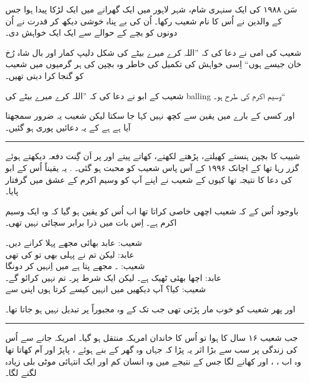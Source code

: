 \documentclass{article}
\begin{document}
\begin{center} \Large
\end{center}

\urdufont		%

سَن ۱۹۸۸ کی ایک سنہری شام، شہر لاہور میں ایک گھرانے میں ایک لڑکا پیدا ہوا جس کے والدین نے اُس کا نام شعیب رکھا۔ اُن کی بے پناہ خوشی دیکھ کر قدرت نے اُن دونوں کو بچے کے حوالے سے ایک ایک خواہش دی۔ 

شعیب کی امی نے دعا کی کہ ''اللہ کرے میرے بیٹے کی شکل دلیپ کمار اور بال شاہ رُخ خان جیسے ہوں`` اِسی خواہش کی تکمیل کی خاطر وہ بچپن کی ہر گرمیوں میں شعیب کو گنجا کرا دیتی تھیں۔ \textit{}

شعیب کے ابو نے دعا کی کہ ''اللہ کرے میرے بیٹے کی balling وسیم اکرم کی طرح ہو۔``

اور کسی کے بارے میں یقین سے کچھ نہیں کہا جا سکتا لیکن شعیب یہ ضرور سمجھتا آیا ہے ہے کے یہ دعائیں پوری ہو گئیں۔

\rule{\textwidth}{1pt}

شییب کا بچپن ہنستے کھیلتے، پڑھتے لکھتے،  کھاتے پیتے اور  پر اَن گِنت دفعہ  دیکھتے ہوئے گزر رہا تھا کے اچانک ۱۹۹۶ کے آس پاس شعیب کو محبت ہو گئی۔ . یہ یقیناً اُس کے ابو کی دعا کا نتیجہ تھا کیوں کے شعیب نے اپنے آپ کو وسیم اکرم کے عشق میں گرفتار پایا۔

باوجود اُس کے کہ شعیب اچھی خاصی  کراتا تھا اب اُس کو یقین ہو گیا کہ وہ ایک  وسیم اکرم ہے۔ اِس بات میں ذرا برابر سچائی نہیں تھی۔


شعیب:  عابد بھائی مجھے پہلا  کرانے دیں۔\\
عابد: لیکن تم نے پہلی  بھی تو کی تھی\\
شعیب: ۔ مجھے پتا ہے میں اِنہیں  کر دونگا\\
عابد: اچھا بھئی ٹھیک ہے۔ لیکن ایک شرط پر۔ تم  نہیں کرائو گے۔\\
شعیب: کیا؟ آپ دیکھیں میں انہیں کیسے  کرتا ہوں اپنی  سے

اور پھر شعیب کو خوب مار پڑتی تھی جب تک کے وہ مجبوراً  پر تبدیل نہیں ہو جاتا تھا۔

\rule{\textwidth}{1pt}

جب شعیب ۱۶ سال کا ہوا تو اُس کا خاندان امریکہ منتقل ہو گیا۔ امریکہ جانے سے اُس کی زندگی پر سب سے بڑا اثر یہ پڑا کہ جہاں وہ گھر کے بنے ہوئے ، پاپڑ اور آم کھاتا تھا وہ اب ، ، اور  کھانے لگا جس کے نتیجے میں وہ انسان کم اور ایک انتہائی موٹی بلی زیادہ لگنے لگا۔  
\end{document}
